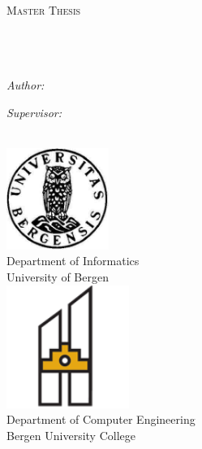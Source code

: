 \documentclass[11pt, a4paper, oneside]{Thesis} %
\begin{document}
\begin{titlepage}
\begin{center}

\textsc{\LARGE \univname}\\[1.5cm] %
\textsc{\Large Master Thesis}\\[0.5cm] %

\HRule \\[0.4cm] %
{\huge \bfseries \ttitle}\\[0.4cm] %
\HRule \\[1.5cm] %
 
\begin{minipage}{0.4\textwidth}
\begin{flushleft} \large
\emph{Author:}\\ {\authornames} %
\end{flushleft}
\end{minipage}
\begin{minipage}{0.4\textwidth}
\begin{flushright} \large
\emph{Supervisor:} \\ {\supname} %
\end{flushright}
\end{minipage}\\[3cm]

\includegraphics[width=0.25\textwidth]{Figures/uib_logo.png}\\
{\normalsize Department of Informatics}\\
{\normalsize University of Bergen}\\[1cm]

\includegraphics[width=0.3\textwidth]{Figures/hib_logo.png}\\
{\normalsize Department of Computer Engineering}\\
{\normalsize Bergen University College}\\[1cm]
 

\end{center}
\end{titlepage}
\end{document}
